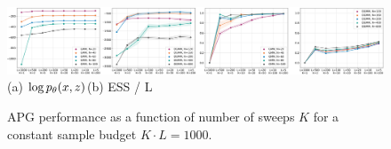 \documentclass[anonymous=false, %
               format=acmsmall, %
               review=true, %
               screen=true, %
               nonacm=true]{acmart}
\theoremstyle{definition}
\begin{document}
\begin{figure}[t!]
  \centering
  \includegraphics[width=1.0\linewidth]{figures/both-budget-dot-v2.pdf}
  \vspace*{-3.5mm}
  {\small \hspace{1em}(a) $\log p_\theta(x, z)$\hspace{16em}(b) ESS / L}\\
  \caption{APG performance as a function of number of sweeps $K$ for a constant sample budget $K \cdot L = 1000$.}
  \label{fig:budget}
\end{figure}
\end{document}
